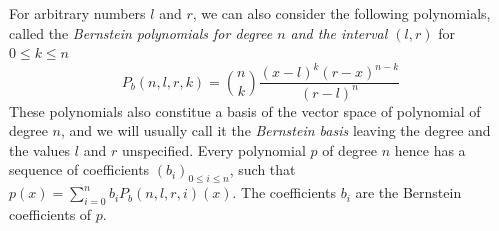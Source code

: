 \documentclass{mscs}
\begin{document}

For arbitrary numbers \(l\) and
\(r\), we can also consider the following polynomials, called
the {\em Bernstein polynomials for degree \(n\) and the interval
\((l,r)\)} for \(0 \leq k \leq n\)
\[P_b(n, l, r, k) = \binom{n}{k} \frac{(x-l)^{k}(r-x)^{n - k}}{(r-l)^n}\]
These polynomials also constitue a basis of the vector space of polynomial
of degree \(n\), and we will usually call it the {\em Bernstein basis} leaving
the degree and the values \(l\) and \(r\) unspecified.
Every polynomial \(p\) of degree \(n\) hence has a sequence of coefficients
\((b_i)_{0\leq i \leq n}\), such that \(p(x) = \sum_{i=0}^n b_i P_b(n,l,r,i)(x)\).  The coefficients
\(b_i\) are the Bernstein coefficients of $p$.
\end{document}
